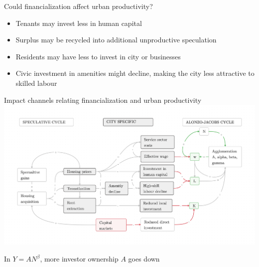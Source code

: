 \documentclass[]{beamer} %
\begin{document}
\begin{frame}{Could financialization affect urban productivity?}
\vspace{.75cm}
\begin{itemize}\Large
\item Tenants may invest less in human capital
\item Surplus may be recycled into additional unproductive speculation
\item Residents may have less to invest in city or businesses
\item Civic investment in amenities might decline, making the city less attractive to skilled labour
\end{itemize}
\end{frame}


\begin{frame}{Impact channels relating financialization and urban productivity}
\includegraphics[scale=.09]{fig/impact-channels.png}

In $Y=AN^\beta$, more investor ownership $A$ goes down 
\end{frame}
\end{document}
